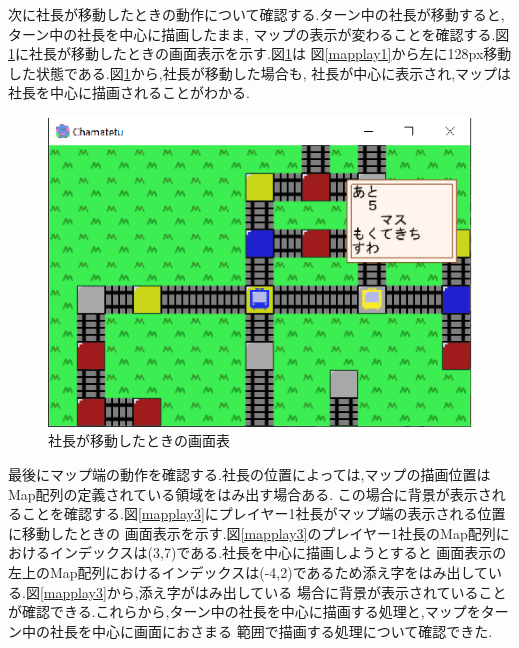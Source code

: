 \documentclass[a4j]{jarticle}
\begin{document}
    次に社長が移動したときの動作について確認する.ターン中の社長が移動すると,ターン中の社長を中心に描画したまま,
    マップの表示が変わることを確認する.図\ref{mapplay2}に社長が移動したときの画面表示を示す.図\ref{mapplay2}は
    図\ref{mapplay1}から左に128px移動した状態である.図\ref{mapplay2}から,社長が移動した場合も,
    社長が中心に表示され,マップは社長を中心に描画されることがわかる.
    \begin{figure}[H]
        \centering
        \includegraphics[scale=1.3]{maplay2.eps}
        \caption{社長が移動したときの画面表}
         \label{mapplay2}
        \end{figure} 

    最後にマップ端の動作を確認する.社長の位置によっては,マップの描画位置はMap配列の定義されている領域をはみ出す場合ある.
    この場合に背景が表示されることを確認する.図\ref{mapplay3}にプレイヤー1社長がマップ端の表示される位置に移動したときの
    画面表示を示す.図\ref{mapplay3}のプレイヤー1社長のMap配列におけるインデックスは(3,7)である.社長を中心に描画しようとすると
    画面表示の左上のMap配列におけるインデックスは(-4,2)であるため添え字をはみ出している.図\ref{mapplay3}から,添え字がはみ出している
    場合に背景が表示されていることが確認できる.これらから,ターン中の社長を中心に描画する処理と,マップをターン中の社長を中心に画面におさまる
    範囲で描画する処理について確認できた.
\end{document}
